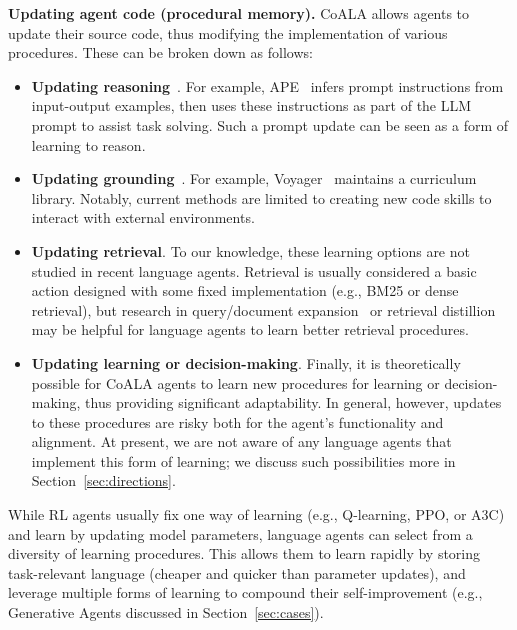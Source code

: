 \documentclass[10pt]{article} %
\begin{document}
\textbf{Updating agent code (procedural memory).} CoALA allows agents to update their source code, thus modifying the implementation of various procedures. These can be broken down as follows:
\begin{itemize}

\item
\textbf{Updating reasoning}~\citep[e.g., prompt templates;][]{gao2020making, zhou2022large}. For example, APE~\citep{zhou2022large} infers prompt instructions from input-output examples, then uses these instructions as part of the LLM prompt to assist task solving. Such a prompt update can be seen as a form of learning to reason.

\item 
\textbf{Updating grounding}~\citep[e.g., code-based skills;][]{liang2023code, ellis2021dreamcoder, wang2023voyager}. 
For example, Voyager~\citep{wang2023voyager} maintains a curriculum library. 
Notably, current methods are limited to creating new code skills to interact with external environments. 


\item 
\textbf{Updating retrieval}. To our knowledge, these learning options are not studied in recent language agents. Retrieval is usually considered a basic action designed with some fixed implementation (e.g., BM25 or dense retrieval), but research in query/document expansion~\citep{nogueira2019document, wang2023query2doc, tang2023referral} or retrieval distillion~\citep{izacard2021unsupervised} may be helpful for language agents to learn better retrieval procedures. 

\item 
\textbf{Updating learning or decision-making}. 
Finally, it is theoretically possible for CoALA agents to learn new procedures for learning or decision-making, thus providing significant adaptability. In general, however, updates to these procedures are risky both for the agent's functionality and alignment. At present, we are not aware of any language agents that implement this form of learning; we discuss such possibilities more in Section~\ref{sec:directions}.

\end{itemize}

While RL agents usually fix one way of learning (e.g., Q-learning, PPO, or A3C) and learn by updating model parameters, language agents can select from a diversity of learning procedures. This allows them to learn rapidly by storing task-relevant language (cheaper and quicker than parameter updates), and leverage multiple forms of learning to compound their self-improvement (e.g., Generative Agents discussed in Section~\ref{sec:cases}). 
\end{document}
